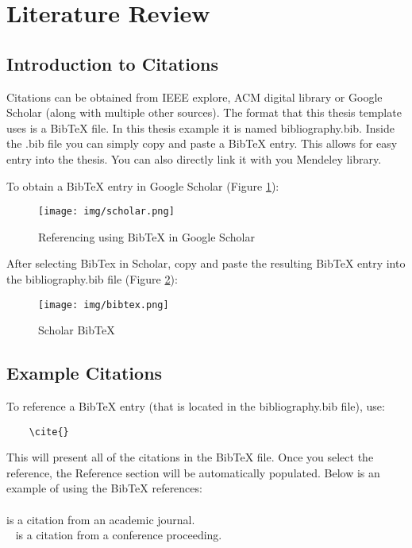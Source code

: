 \section{Literature Review}
\subsection{Introduction to Citations}
Citations can be obtained from IEEE explore, ACM digital library or Google Scholar (along with multiple other sources). The format that this thesis template uses is a BibTeX file. In this thesis example it is named bibliography.bib. Inside the .bib file you can simply copy and paste a BibTeX entry. This allows for easy entry into the thesis. You can also directly link it with you Mendeley library.

To obtain a BibTeX entry in Google Scholar (Figure \ref{lab:scholarBibTeX}):
\begin{figure}[ht!]
 	\centering
 	\caption{Referencing using BibTeX in Google Scholar}
 	\texttt{[image: img/scholar.png]}
 	\label{lab:scholarBibTeX}
 \end{figure}
 
 After selecting BibTex in Scholar, copy and paste the resulting BibTeX entry into the bibliography.bib file (Figure \ref{lab:BibTeX}):
 
 \begin{figure}[ht!]
 	\centering
 	\caption{Scholar BibTeX}
 	\texttt{[image: img/bibtex.png]}
 	\label{lab:BibTeX}
 \end{figure}




\subsection{Example Citations}
To reference a BibTeX entry (that is located in the bibliography.bib file), use:

\begin{verbatim}
    \cite{}
\end{verbatim}

This will present all of the citations in the BibTeX file. Once you select the reference, the Reference section will be automatically populated. Below is an example of using the BibTeX references:\\\\


\cite{Quille2019} is a citation from an academic journal.\\\
\cite{Quille:Gender} is a citation from a conference proceeding.



